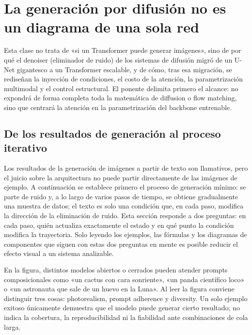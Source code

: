 \section{La generación por difusión no es un diagrama de una sola red}

Esta clase no trata de «si un Transformer puede generar imágenes», sino de por qué el denoiser (eliminador de ruido) de los sistemas de difusión migró de un U-Net gigantesco a un Transformer escalable, y de cómo, tras esa migración, se rediseñan la inyección de condiciones, el costo de la atención, la parametrización multimodal y el control estructural. El ponente delimita primero el alcance: no expondrá de forma completa toda la matemática de diffusion o flow matching, sino que centrará la atención en la parametrización del backbone entrenable.

\subsection{De los resultados de generación al proceso iterativo}

Los resultados de la generación de imágenes a partir de texto son llamativos, pero el juicio sobre la arquitectura no puede partir directamente de las imágenes de ejemplo. A continuación se establece primero el proceso de generación mínimo: se parte de ruido y, a lo largo de varios pasos de tiempo, se obtiene gradualmente una muestra de datos; el texto es solo una condición que, en cada paso, modifica la dirección de la eliminación de ruido. Esta sección responde a dos preguntas: en cada paso, quién actualiza exactamente el estado y en qué punto la condición modifica la trayectoria. Solo leyendo los ejemplos, las fórmulas y los diagramas de componentes que siguen con estas dos preguntas en mente es posible reducir el efecto visual a un sistema analizable.


En la figura, distintos modelos abiertos o cerrados pueden atender prompts composicionales como «un cactus con cara sonriente», «un panda científico loco» o «un astronauta que sale de un huevo en la Luna». Al leer la figura conviene distinguir tres cosas: photorealism, prompt adherence y diversity. Un solo ejemplo exitoso únicamente demuestra que el modelo puede generar cierto resultado; no indica la cobertura, la reproducibilidad ni la fiabilidad ante combinaciones de cola larga.

